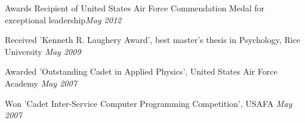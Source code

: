 
\begin{rSection}{Awards}
Recipient of United States Air Force Commendation Medal for exceptional leadership\hfill {\em May 2012}
\item Received 'Kenneth R. Laughery Award', best master’s thesis in Psychology, Rice University \hfill {\em May 2009}
\item Awarded 'Outstanding Cadet in Applied Physics', United States Air Force Academy \hfill {\em May 2007}
\item Won 'Cadet Inter-Service Computer Programming Competition', USAFA \hfill {\em May 2007}
\end{rSection}
